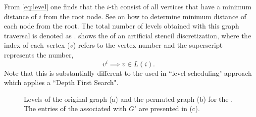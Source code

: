 From \cref{eq:level} one finds that the $i$-th \level consist of all vertices that have a minimum distance of $i$ from the root node. See  on how to determine minimum distance of each node from the root. The total number of levels obtained with this graph traversal is denoted as \totalLvl.  shows the  \levels of an artificial stencil discretization, where the index of each vertex ($v$) refers to the vertex number and the superscript represents the \level number, \ie
\begin{equation}\label{eq:node_notation}
	v^i \implies v \in L(i).
\end{equation}
Note that this is substantially different to the \levels used in ``level-scheduling" \cite{saad} approach which applies a ``Depth First Search".

\begin{figure}[tbhp]
	\centering
	\hspace{1em}
	\hspace{1em}
	\caption{Levels of the original graph (a) and the permuted graph (b) for the \stex. The entries of  the \levelPtr associated with $G'$ are presented in (c).}
	\label{fig:2d-7pt_step_1_2}
\end{figure}


